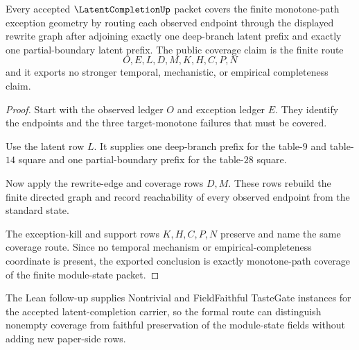\begin{theorem}
\label{thm:latent-completion-monotone-path-coverage}
Every accepted $\LatentCompletionUp$ packet covers the finite monotone-path exception geometry by routing each observed endpoint through the displayed rewrite graph after adjoining exactly one deep-branch latent prefix and exactly one partial-boundary latent prefix. The public coverage claim is the finite route
$$
O,E,L,D,M,K,H,C,P,N
$$
and it exports no stronger temporal, mechanistic, or empirical completeness claim.
\end{theorem}
\begin{proof}
Start with the observed ledger $O$ and exception ledger $E$. They identify the endpoints and the three target-monotone failures that must be covered.

Use the latent row $L$. It supplies one deep-branch prefix for the table-$9$ and table-$14$ square and one partial-boundary prefix for the table-$28$ square.

Now apply the rewrite-edge and coverage rows $D,M$. These rows rebuild the finite directed graph and record reachability of every observed endpoint from the standard state.

The exception-kill and support rows $K,H,C,P,N$ preserve and name the same coverage route. Since no temporal mechanism or empirical-completeness coordinate is present, the exported conclusion is exactly monotone-path coverage of the finite module-state packet.
\end{proof}



The Lean follow-up supplies Nontrivial and FieldFaithful TasteGate instances for the accepted latent-completion carrier, so the formal route can distinguish nonempty coverage from faithful preservation of the module-state fields without adding new paper-side rows.

